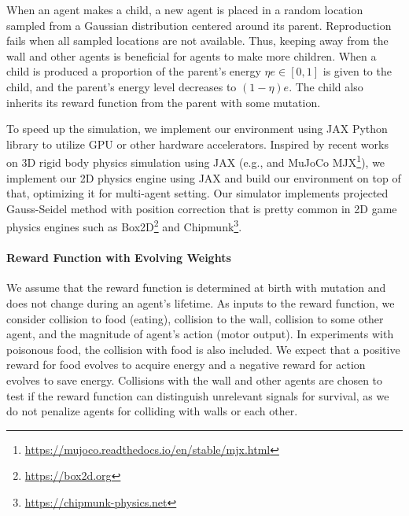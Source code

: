 When an agent makes a child, a new agent is placed in a random location sampled from a Gaussian distribution centered around its parent. %
Reproduction fails when all
sampled locations are not available. Thus, keeping away from the wall and other agents is beneficial for agents to make more children. When a child is produced
a proportion of the parent's energy $\eta e \in [0, 1]$ is given to the child, and the parent's energy level decreases to $(1-\eta)e$.
The child also inherits its reward function from the parent with some mutation.

To speed up the simulation, we implement our environment using JAX Python library \citep{jax2018github} to utilize GPU or other hardware accelerators. Inspired by recent works on 3D rigid body physics simulation using JAX (e.g., \citet{brax2021github} and MuJoCo \citep{todorov2012mujoco} MJX\footnote{\url{https://mujoco.readthedocs.io/en/stable/mjx.html}}), we implement our 2D physics engine using JAX and build our environment on top of that, optimizing it for multi-agent setting. Our simulator implements projected Gauss-Seidel method with position correction \citep{catto2005iterative} that is pretty common in 2D game physics engines such as Box2D\footnote{\url{https://box2d.org}} and Chipmunk\footnote{\url{https://chipmunk-physics.net}}.

\paragraph{Reward Function with Evolving Weights} %
We assume that the reward function is determined at birth with mutation and does not change during an agent's lifetime. As inputs to the reward function, we consider  collision to food (eating),  collision to the wall,  collision to some other agent, and  the magnitude of agent's action (motor output). In experiments with poisonous food, the collision with food is also included.
We expect that a positive reward for food evolves to acquire energy
and a negative reward for action evolves to save energy. Collisions with the wall and other agents are chosen to test if the reward function can distinguish unrelevant signals for survival, as we do not penalize agents for colliding with walls or each other.

